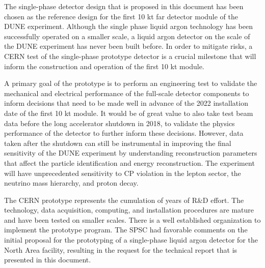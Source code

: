 \label{summary}
The single-phase detector design that is proposed in this document has been chosen as the reference design for the first 10 kt far detector module of the DUNE experiment.  Although the single phase liquid argon technology has been successfully operated on a smaller scale, a liquid argon detector on the scale of the DUNE experiment has never been built before.  In order to mitigate risks, a CERN test of the single-phase prototype detector is a crucial milestone that will inform the construction and operation of the first 10 kt module.

A primary goal of the prototype is to perform an engineering test to validate the mechanical and electrical performance of the full-scale detector components to inform decisions that need to be made well in advance of the 2022 installation date of the first 10 kt module.  It would be of great value to also take test beam data before the long accelerator shutdown in 2018, to validate the physics performance of the detector to further inform these decisions.  However, data taken after the shutdown can still be instrumental in improving the final sensitivity of the DUNE experiment by understanding reconstruction parameters that affect the particle identification and energy reconstruction.   The experiment will have unprecedented sensitivity to CP violation in the lepton sector, the neutrino mass hierarchy, and proton decay.   

The CERN prototype represents the cumulation of years of R\&D effort.  The technology, data acquisition, computing, and installation procedures are mature and have been tested on smaller scales.  There is a well established organization to implement the prototype program.  The SPSC had favorable comments on the initial proposal for the prototyping of a single-phase liquid argon detector for the
North Area facility, resulting in the request for the technical report that is presented in this document.